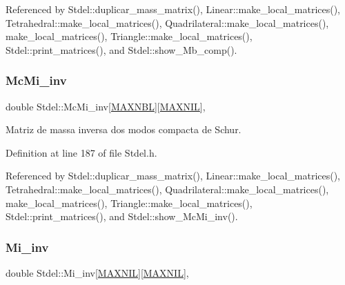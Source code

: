 Referenced by Stdel\+::duplicar\+\_\+mass\+\_\+matrix(), Linear\+::make\+\_\+local\+\_\+matrices(), Tetrahedral\+::make\+\_\+local\+\_\+matrices(), Quadrilateral\+::make\+\_\+local\+\_\+matrices(), make\+\_\+local\+\_\+matrices(), Triangle\+::make\+\_\+local\+\_\+matrices(), Stdel\+::print\+\_\+matrices(), and Stdel\+::show\+\_\+\+Mb\+\_\+comp().

\mbox{\label{classStdel_acc685141e80bcce9703e37f32cc5c42c}} 
\subsubsection{\texorpdfstring{Mc\+Mi\+\_\+inv}{McMi\_inv}}
{\footnotesize\ttfamily double Stdel\+::\+Mc\+Mi\+\_\+inv\mbox{[}\hyperlink{MyOptions_8h_aed8828a63ec0a2a0461b7c9ed39dd648}{M\+A\+X\+N\+BL}\mbox{]}\mbox{[}\hyperlink{MyOptions_8h_a463cdf068fb6289d1f81dac7e0f76ab5}{M\+A\+X\+N\+IL}\mbox{]}\hspace{0.3cm}{\ttfamily [protected]}, {\ttfamily [inherited]}}



Matriz de massa inversa dos modos compacta de Schur. 



Definition at line 187 of file Stdel.\+h.



Referenced by Stdel\+::duplicar\+\_\+mass\+\_\+matrix(), Linear\+::make\+\_\+local\+\_\+matrices(), Tetrahedral\+::make\+\_\+local\+\_\+matrices(), Quadrilateral\+::make\+\_\+local\+\_\+matrices(), make\+\_\+local\+\_\+matrices(), Triangle\+::make\+\_\+local\+\_\+matrices(), Stdel\+::print\+\_\+matrices(), and Stdel\+::show\+\_\+\+Mc\+Mi\+\_\+inv().

\mbox{\label{classStdel_a53a9490d5a02a96473d96848bac3711a}} 
\subsubsection{\texorpdfstring{Mi\+\_\+inv}{Mi\_inv}}
{\footnotesize\ttfamily double Stdel\+::\+Mi\+\_\+inv\mbox{[}\hyperlink{MyOptions_8h_a463cdf068fb6289d1f81dac7e0f76ab5}{M\+A\+X\+N\+IL}\mbox{]}\mbox{[}\hyperlink{MyOptions_8h_a463cdf068fb6289d1f81dac7e0f76ab5}{M\+A\+X\+N\+IL}\mbox{]}\hspace{0.3cm}{\ttfamily [protected]}, {\ttfamily [inherited]}}



